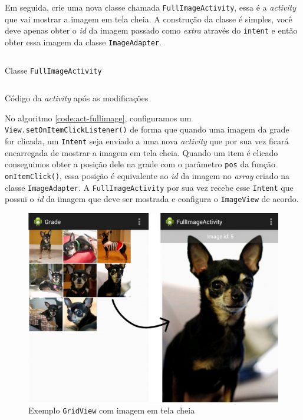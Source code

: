 \documentclass[a4paper,12pt,brazil]{book}
\begin{document}
\begin{singlespace}
Em seguida, crie uma nova classe chamada \texttt{FullImageActivity}, essa é a \emph{activity} que vai mostrar a imagem em tela cheia. A construção da classe é simples, você deve apenas obter o \emph{id} da imagem passado como \emph{extra} através do \texttt{intent} e então obter essa imagem da classe \texttt{ImageAdapter}.

\begin{listing}[H]
\inputminted[linenos=true,fontsize=\small,frame=lines, framesep=2mm, tabsize=2,numbersep=5pt]{java}{src/design/FullImageActivity.java}
\caption{Classe \texttt{FullImageActivity}}
\end{listing}	 	 	

\begin{listing}[H]
\inputminted[linenos=true,fontsize=\small,frame=lines, framesep=2mm, tabsize=2,numbersep=5pt]{java}{src/design/grid-activity-p2.java}
\caption{Código da \emph{activity} após as modificações}
\label{code:act-fullimage}
\end{listing}	 

No algoritmo \ref{code:act-fullimage}, configuramos um \texttt{View.setOnItemClickListener()} de forma que quando uma imagem da grade for clicada, um \texttt{Intent} seja enviado a uma nova \emph{activity} que por sua vez ficará encarregada de mostrar a imagem em tela cheia.  Quando um item é clicado conseguimos obter a posição dele na grade com o parâmetro \texttt{pos} da função \texttt{onItemClick()}, essa posição é equivalente ao \emph{id} da imagem no \emph{array} criado na classe \texttt{ImageAdapter}.  A \texttt{FullImageActivity} por sua vez recebe esse \texttt{Intent} que possui o \emph{id} da imagem que deve ser mostrada e configura o \texttt{ImageView} de acordo. 

\begin{figure}[H]
  \centering
  \includegraphics[width=.80\textwidth]{figuras/design/grid-fullimage.jpg}
  \caption{Exemplo \texttt{GridView} com imagem em tela cheia}
  \label{fig:e}
\end{figure}


\end{singlespace}
\end{document}
